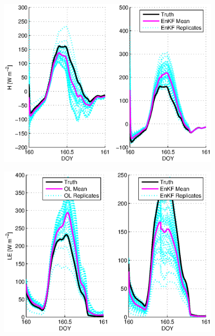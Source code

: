 \documentclass[letterpaper]{tufte-handout}
\begin{document}
\begin{figure}
  \includegraphics[width=\textwidth]{4ch}
  \caption{}
\end{figure}
\begin{figure}
  \includegraphics[width=\textwidth]{4cle}
  \caption{}
\end{figure}
\end{document}
